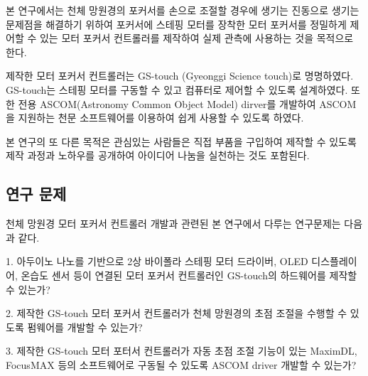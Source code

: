 본 연구에서는 천체 망원경의 포커서를 손으로 조절할 경우에 생기는 진동으로 생기는 문제점을 해결하기 위하여 포커서에 스테핑 모터를 장착한 모터 포커서를 정밀하게 제어할 수 있는 모터 포커서 컨트롤러를 제작하여 실제 관측에 사용하는 것을 목적으로 한다. 

제작한 모터 포커서 컨트롤러는 GS-touch (Gyeonggi Science touch)로 명명하였다. GS-touch는 스테핑 모터를 구동할 수 있고 컴퓨터로 제어할 수 있도록 설계하였다. 또한 전용 ASCOM(Astronomy Common Object Model) dirver를 개발하여 ASCOM을 지원하는 천문 소프트웨어를 이용하여 쉽게 사용할 수 있도록 하였다.

본 연구의 또 다른 목적은 관심있는 사람들은 직접 부품을 구입하여 제작할 수 있도록 제작 과정과 노하우를 공개하여 아이디어 나눔을 실천하는 것도 포함된다.


\subsection{연구 문제}

천체 망원경 모터 포커서 컨트롤러 개발과 관련된 본 연구에서 다루는 연구문제는 다음과 같다. 

1. 아두이노 나노를 기반으로 2상 바이폴라 스테핑 모터 드라이버, OLED 디스플레이어, 온습도 센서 등이 연결된 모터 포커서 컨트롤러인 GS-touch의 하드웨어를 제작할 수 있는가?

2. 제작한 GS-touch 모터 포커서 컨트롤러가 천체 망원경의 초점 조절을 수행할 수 있도록 펌웨어를 개발할 수 있는가?

3. 제작한 GS-touch 모터 포터서 컨트롤러가 자동 초점 조절 기능이 있는 MaximDL, FocusMAX 등의 소프트웨어로 구동될 수 있도록 ASCOM driver 개발할 수 있는가?